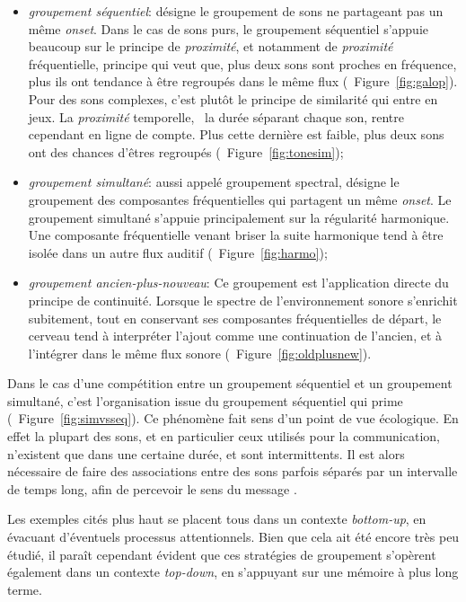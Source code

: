 \begin{itemize}
\item \emph{groupement séquentiel}: désigne le groupement de sons ne partageant pas un même \emph{onset}. Dans le cas de sons purs, le groupement séquentiel s'appuie beaucoup sur le principe de \emph{proximité}, et notamment de \emph{proximité} fréquentielle, principe qui veut que, plus deux sons sont proches en fréquence, plus ils ont tendance à être regroupés dans le même flux (\cf~Figure~\ref{fig:galop}). Pour des sons complexes, c'est plutôt le principe de similarité qui entre en jeux. La \emph{proximité} temporelle, \ie~la durée séparant chaque son, rentre cependant en ligne de compte. Plus cette dernière est faible, plus deux sons ont des chances d'êtres regroupés (\cf~Figure~\ref{fig:tonesim});
\item \emph{groupement simultané}: aussi appelé groupement spectral, désigne le groupement des composantes fréquentielles qui partagent un même \emph{onset}. Le groupement simultané s'appuie principalement sur la régularité harmonique. Une composante fréquentielle venant briser la suite harmonique tend à être isolée dans un autre flux auditif (\cf~Figure~\ref{fig:harmo});
\item \emph{groupement ancien-plus-nouveau}: Ce groupement est l'application directe du principe de continuité. Lorsque le spectre de l'environnement sonore s'enrichit subitement, tout en conservant ses composantes fréquentielles de départ, le cerveau tend à interpréter l'ajout comme une continuation de l'ancien, et à l'intégrer dans le même flux sonore (\cf~Figure~\ref{fig:oldplusnew}).
\end{itemize}

Dans le cas d'une compétition entre un groupement séquentiel et un groupement simultané, c'est l'organisation issue du groupement séquentiel qui prime (\cf~Figure~\ref{fig:simvsseq}). Ce phénomène fait sens d'un point de vue écologique. En effet la plupart des sons, et en particulier ceux utilisés pour la communication, n'existent que dans une certaine durée, et sont intermittents. Il est alors nécessaire de faire des associations entre des sons parfois séparés par un intervalle de temps long, afin de percevoir le sens du message \citep{winkler2009modeling}.

Les exemples cités plus haut se placent tous dans un contexte \emph{bottom-up}, en évacuant d'éventuels processus attentionnels. Bien que cela ait été encore très peu étudié, il paraît cependant évident que ces stratégies de groupement s’opèrent également dans un contexte \emph{top-down}, en s'appuyant sur une mémoire à plus long terme.


